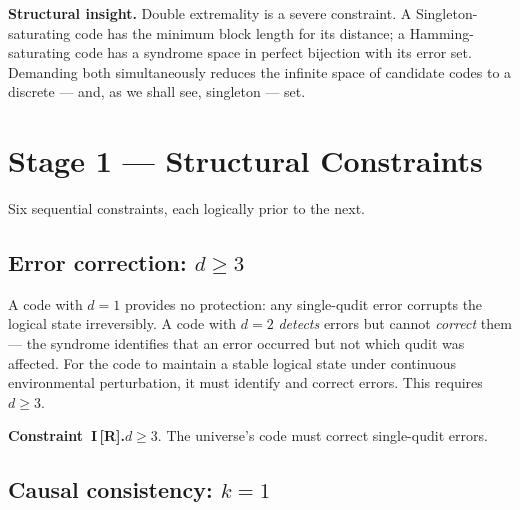 \documentclass[11pt,a4paper]{article}
\newcommand{\Rmark}{\textcolor{green!50!black}{\textbf{[R]}}}
\begin{document}
\begin{mdframed}[backgroundcolor=insightbg,linecolor=insightcol, linewidth=1pt]
\textbf{Structural insight.}\quad
Double extremality is a severe constraint. A Singleton-saturating code has the minimum block length for its distance; a Hamming-saturating code has a syndrome space in perfect bijection with its error set. Demanding both simultaneously reduces the infinite space of candidate codes to a discrete --- and, as we shall see, singleton --- set.
\end{mdframed}

\section{Stage 1 --- Structural Constraints}
\label{sec:stage1}

Six sequential constraints, each logically prior to the next.

\subsection{Error correction: $d\geq3$}
\label{sec:dist}

A code with $d=1$ provides no protection: any single-qudit error corrupts the logical state irreversibly. A code with $d=2$ \emph{detects} errors but cannot \emph{correct} them --- the syndrome identifies that an error occurred but not which qudit was affected. For the code to maintain a stable logical state under continuous environmental perturbation, it must identify and correct errors. This requires $d\geq3$.

\begin{mdframed}[backgroundcolor=Rbg,linecolor=Rcolor,linewidth=1.5pt]
\textbf{Constraint~I\,\Rmark.}\quad $d\geq3$. The universe's code must correct single-qudit errors.
\end{mdframed}

\subsection{Causal consistency: $k=1$}
\label{sec:k1}
\end{document}
